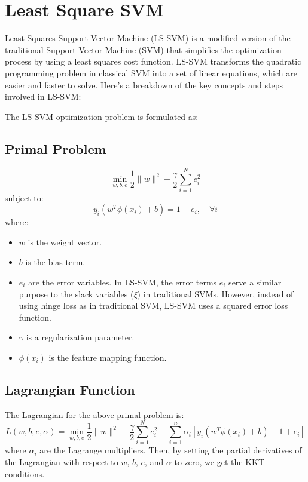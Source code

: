 \section{Least Square SVM}
\label{sec:ls_svm}
Least Squares Support Vector Machine (LS-SVM) is a modified version of the traditional Support Vector Machine (SVM) that simplifies the optimization process by using a least squares cost function. LS-SVM transforms the quadratic programming problem in classical SVM into a set of linear equations, which are easier and faster to solve. Here’s a breakdown of the key concepts and steps involved in LS-SVM:

The LS-SVM optimization problem is formulated as:

\subsection{Primal Problem}

   \[
   \min_{w, b, e} \frac{1}{2} \|w\|^2 + \frac{\gamma}{2} \sum_{i=1}^N e_i^2
   \]
   subject to:
   \[
   y_i (w^T \phi(x_i) + b) = 1 - e_i, \quad \forall i \]
   where:
   \begin{itemize}
	   \item \( w \) is the weight vector.
   	   \item \( b \) is the bias term.
   	   \item \( e_i \) are the error variables. In LS-SVM, the error terms $e_i$ serve a similar purpose to the slack variables ($\xi$) in traditional SVMs. However, instead of using hinge loss as in traditional SVM, LS-SVM uses a squared error loss function. 
   	   \item \( \gamma \) is a regularization parameter.
   	   \item \( \phi(x_i) \) is the feature mapping function.
   \end{itemize}

\subsection{Lagrangian Function}
   The Lagrangian for the above primal problem is:
   \[
   L(w, b, e, \alpha) = \min_{w, b, e} \frac{1}{2} \|w\|^2 + \frac{\gamma}{2} \sum_{i=1}^N e_i^2 - \sum_{i=1}^n \alpha_i \left[ y_i (w^T \phi(x_i) + b) - 1 + e_i \right]
   \]
   where \( \alpha_i \) are the Lagrange multipliers. Then, by setting the partial derivatives of the Lagrangian with respect to \( w \), \( b \), \( e \), and \( \alpha \) to zero, we get the KKT conditions.

